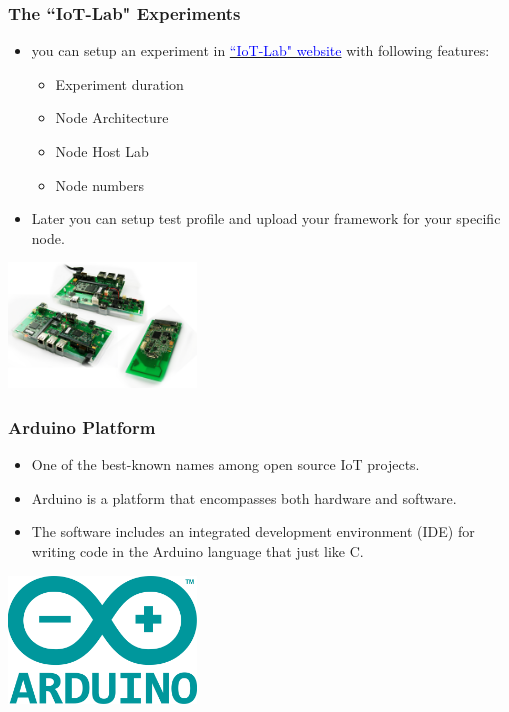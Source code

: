 \documentclass{beamer}
\begin{document}
\begin{frame}
	\frametitle{The ``IoT-Lab" Experiments}
	\vspace{.1cm}
	\begin{itemize}
		\item you can setup an experiment in
		\href{http://iot-lab.info}{\textcolor{blue}{``IoT-Lab" website}} with following
		features:
		\begin{itemize}
			\item Experiment duration
			\item Node Architecture
			\item Node Host Lab
			\item Node numbers
		\end{itemize}
		\item Later you can setup test profile and upload your framework for your specific node.
	\end{itemize}
	\vspace{.5cm}
	\hspace*{5.5cm} \includegraphics[width=5cm]{figs/iot-lab-3.png}
\end{frame}

\begin{frame}
	\frametitle{Arduino Platform}
	\vspace{.1cm}
	\begin{itemize}
		\item One of the best-known names among open source IoT projects.
		\item Arduino is a platform that encompasses both hardware and software.
		\item The software includes an integrated development environment (IDE) for writing code in the Arduino language that just like C.
	\end{itemize}
	\vspace{.5cm}
	\hspace*{5.5cm} \includegraphics[width=5cm]{figs/Arduino-Logo.png}
\end{frame}
\end{document}
